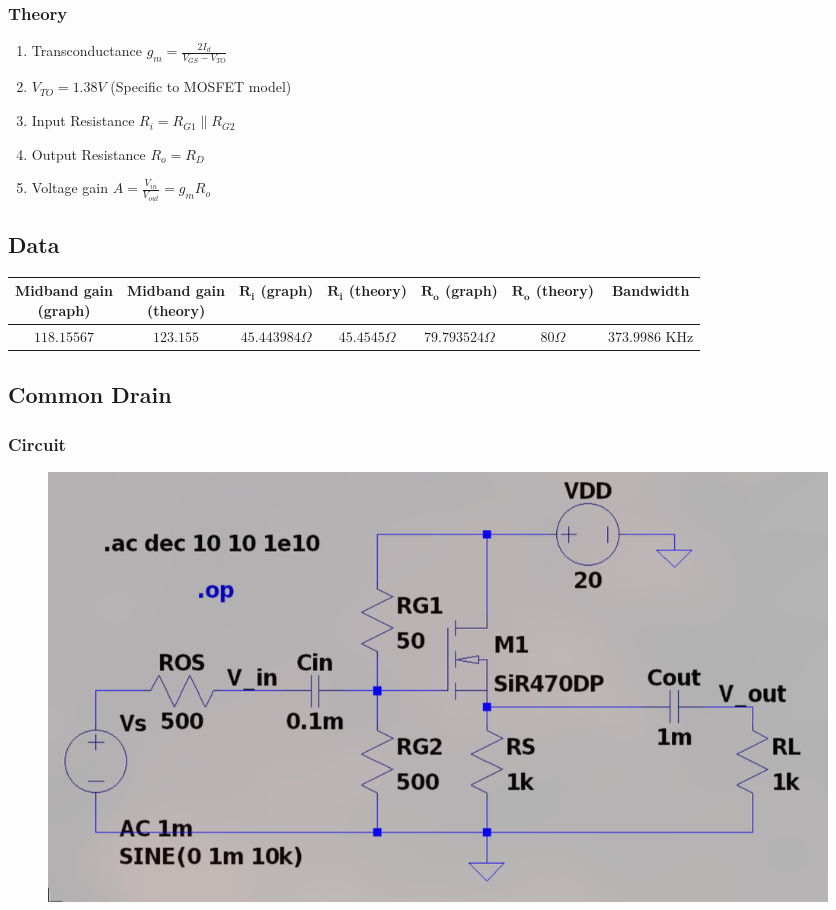\documentclass{article}
\begin{document}
\subsubsection{Theory}
\begin{enumerate}
    \item Transconductance $g_m = \frac{2I_d}{V_{GS}-V_{TO}}$ 
    \item $V_{TO} = 1.38V$ (Specific to MOSFET model)
    \item Input Resistance $R_i = R_{G1} \parallel R_{G2}$  
    \item Output Resistance $R_o = R_D $ 
    \item Voltage gain $A = \frac{V_{in}}{V_{out}} = g_m R_o$ 
\end{enumerate} 
\subsection{Data}
\begin{tabular}{|c|c|c|c|c|c|c|}
\hline
\makecell{\textbf{Midband gain} \\ \textbf{(graph)}} & \makecell{\textbf{Midband gain} \\ \textbf{(theory)}} & \makecell{$\mathbf{R_i}$ \\ \textbf{(graph)}} & \makecell{{$\mathbf{R_i}$} \\ \textbf{(theory)}} & \makecell{{$\mathbf{R_o}$} \\ \textbf{(graph)}} & \makecell{{$\mathbf{R_o}$} \\ \textbf{(theory)}} & \textbf{Bandwidth} \\
\hline
$118.15567$ & $123.155$ & $45.443984\Omega$ & $45.4545 \Omega$& $79.793524 \Omega$ & $80 \Omega$ & $373.9986$ KHz \\
\hline
\end{tabular}

\pagebreak
\subsection{Common Drain}
\subsubsection{Circuit}
\begin{figure}[h!]
        \centering
        \includegraphics[width=0.7\linewidth]{figs/mosfet_cd_ckt.png}
    \end{figure}
\end{document}
